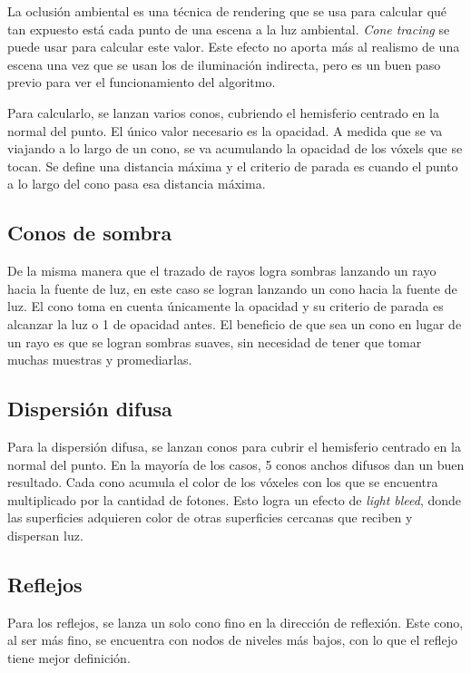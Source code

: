 La oclusión ambiental es una técnica de rendering que se usa para calcular qué tan expuesto está cada punto de una escena a la luz ambiental.
\textit{Cone tracing} se puede usar para calcular este valor.
Este efecto no aporta más al realismo de una escena una vez que se usan los de iluminación indirecta, pero es un buen paso previo para ver el funcionamiento del algoritmo.

Para calcularlo, se lanzan varios conos, cubriendo el hemisferio centrado en la normal del punto.
El único valor necesario es la opacidad.
A medida que se va viajando a lo largo de un cono, se va acumulando la opacidad de los vóxels que se tocan.
Se define una distancia máxima y el criterio de parada es cuando el punto a lo largo del cono pasa esa distancia máxima.

\subsection{Conos de sombra}

De la misma manera que el trazado de rayos logra sombras lanzando un rayo hacia la fuente de luz, en este caso se logran lanzando un cono hacia la fuente de luz.
El cono toma en cuenta únicamente la opacidad y su criterio de parada es alcanzar la luz o 1 de opacidad antes.
El beneficio de que sea un cono en lugar de un rayo es que se logran sombras suaves, sin necesidad de tener que tomar muchas muestras y promediarlas.

\subsection{Dispersión difusa}

Para la dispersión difusa, se lanzan conos para cubrir el hemisferio centrado en la normal del punto.
En la mayoría de los casos, 5 conos anchos difusos dan un buen resultado.
Cada cono acumula el color de los vóxeles con los que se encuentra multiplicado por la cantidad de fotones.
Esto logra un efecto de \textit{light bleed}, donde las superficies adquieren color de otras superficies cercanas que reciben y dispersan luz.

\subsection{Reflejos}

Para los reflejos, se lanza un solo cono fino en la dirección de reflexión.
Este cono, al ser más fino, se encuentra con nodos de niveles más bajos, con lo que el reflejo tiene mejor definición.


